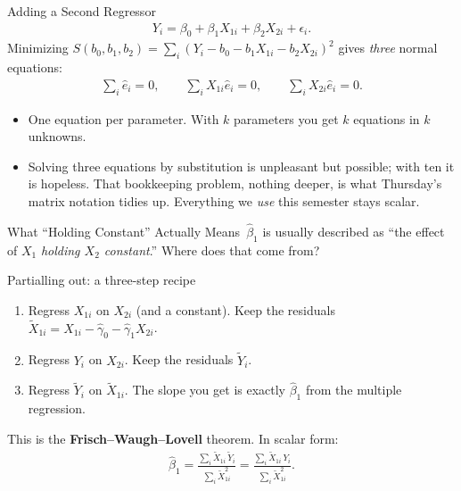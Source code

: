 \documentclass[aspectratio=169,11pt,xcolor=dvipsnames]{beamer}
\newcommand{\core}{\,\raisebox{0.6pt}{\textcolor{corestar}{$\bigstar$}}}
\begin{document}
\begin{frame}{Adding a Second Regressor}
\begin{align*}
  Y_i = \beta_0 + \beta_1 X_{1i} + \beta_2 X_{2i} + \epsilon_i .
\end{align*}
Minimizing $S(b_0,b_1,b_2) = \sum_i (Y_i - b_0 - b_1X_{1i} - b_2X_{2i})^2$ gives
\emph{three} normal equations:
\begin{align*}
  \sum_i \hat e_i = 0, \qquad
  \sum_i X_{1i}\hat e_i = 0, \qquad
  \sum_i X_{2i}\hat e_i = 0 .
\end{align*}
\vskip4pt
\begin{itemize}
  \item One equation per parameter. With $k$ parameters you get $k$ equations
        in $k$ unknowns.
  \item Solving three equations by substitution is unpleasant but possible;
        with ten it is hopeless. That bookkeeping problem, nothing deeper, is
        what Thursday's matrix notation tidies up. Everything we \emph{use}
        this semester stays scalar.
\end{itemize}
\end{frame}

\begin{frame}{What ``Holding Constant'' Actually Means\core}
$\hat\beta_1$ is usually described as ``the effect of $X_1$ \emph{holding $X_2$
constant}.'' Where does that come from?
\vskip4pt
\begin{block}{Partialling out: a three-step recipe}
\begin{enumerate}\itemsep2pt
  \item Regress $X_{1i}$ on $X_{2i}$ (and a constant). Keep the residuals
        $\tilde X_{1i} = X_{1i} - \hat\gamma_0 - \hat\gamma_1 X_{2i}$.
  \item Regress $Y_i$ on $X_{2i}$. Keep the residuals $\tilde Y_i$.
  \item Regress $\tilde Y_i$ on $\tilde X_{1i}$. \alert{The slope you get is
        exactly $\hat\beta_1$ from the multiple regression.}
\end{enumerate}
\end{block}
\vskip2pt
This is the \textbf{Frisch--Waugh--Lovell} theorem. In scalar form:
\begin{align*}
  \hat\beta_1 = \frac{\sum_i \tilde X_{1i}\, \tilde Y_i}{\sum_i \tilde X_{1i}^2}
              = \frac{\sum_i \tilde X_{1i}\, Y_i}{\sum_i \tilde X_{1i}^2} .
\end{align*}
\end{frame}
\end{document}
